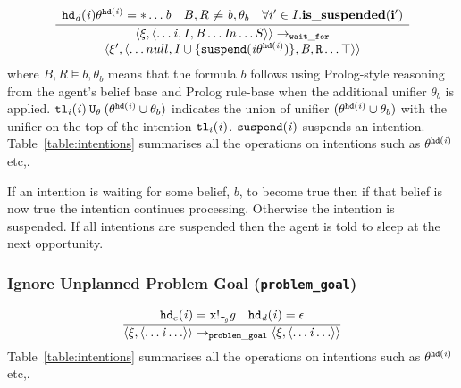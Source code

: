 \begin{equation}
\frac{
\begin{array}{c}
  \mathit{{\tt hd}_d}(\mathit{i})\theta^{{\tt hd}(\mathit{i})} = *\ldots{\ensuremath{\mathit{b}}}
\quad B, R \not \models \mathit{b}, \theta_b
\quad \forall i' \in I. \bf is\_suspended(i') 
\end{array}
}{
\begin{array}{c}
  \langle \xi, \langle \ldots \mathit{i}, \mathit{I}, \mathit{B} \ldots \mathit{In} \ldots S \rangle \rangle
\rightarrow_{\tt wait\_for} \\
\langle \xi', \langle \ldots null,  \mathit{I} \cup \{\tt suspend(\mathit{i}\theta^{{\tt hd}(\mathit{i})})\},
\mathit{B}, R
\ldots \top \rangle \rangle
\end{array}
}
\end{equation}
where $B, R \models b, \theta_b$ means that the
formula $b$ follows using Prolog-style reasoning from the agent's belief base and Prolog rule-base when the additional unifier $\theta_b$ is applied.  ${\tt tl}_i(\mathit{i}) \: {\tt U}_{\theta} \: (\theta^{{\tt hd}(\mathit{i})} \cup \theta_b)$ indicates the union of unifier $(\theta^{{\tt hd}(\mathit{i})} \cup \theta_b)$ with the unifier on the top of the intention ${\tt tl}_i(\mathit{i})$.  $\tt suspend(\mathit{i})$ suspends an intention. 
Table~\ref{table:intentions} summarises all the operations on intentions such as $\theta^{{\tt hd}(\mathit{i})}$ etc,.

If an intention is waiting for some belief, $b$, to become true then if that belief is now true the intention continues processing.  Otherwise
the intention is suspended.  If all intentions are suspended then the agent is told to sleep at the next opportunity.

\subsubsection*{Ignore Unplanned Problem Goal ({\tt problem\_goal})}

\begin{equation}
\frac{{\tt hd}_e(\mathit{i})= \mathit{\mathtt{x}!_{\mathit{\tau_{\mathit{g}}}}\mathit{g}}
\quad \mathit{{\tt hd}_d}(\mathit{i}) = \epsilon
}
{\langle \xi, \langle \ldots \mathit{i} \ldots \rangle \rangle \rightarrow_{\tt problem\_goal}
\langle \xi, \langle \ldots \mathit{i} \ldots \rangle \rangle
}
\end{equation}
Table~\ref{table:intentions} summarises all the operations on intentions such as $\theta^{{\tt hd}(\mathit{i})}$ etc,.

